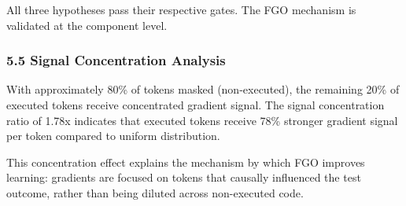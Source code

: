 All three hypotheses pass their respective gates. The FGO mechanism is validated at the component level.

\subsubsection{5.5 Signal Concentration Analysis}

With approximately 80\% of tokens masked (non-executed), the remaining 20\% of executed tokens receive concentrated gradient signal. The signal concentration ratio of 1.78x indicates that executed tokens receive 78\% stronger gradient signal per token compared to uniform distribution.

This concentration effect explains the mechanism by which FGO improves learning: gradients are focused on tokens that causally influenced the test outcome, rather than being diluted across non-executed code.
